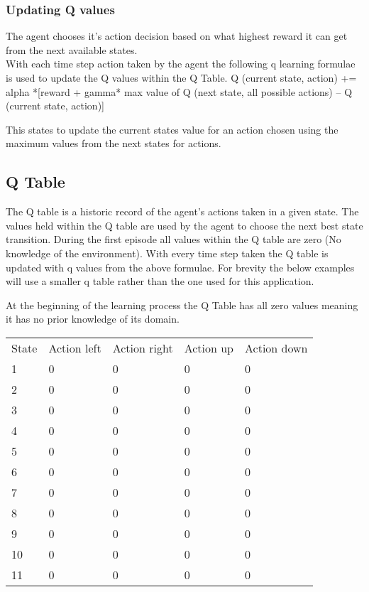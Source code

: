 \subsubsection{Updating Q values}
The agent chooses it's action decision based on what highest reward it can get from the next available states.\\
With each time step action taken by the agent the following q learning formulae is used to update the Q values within the Q Table.
Q (current state, action) += alpha *[reward + gamma* max value of Q (next state, all possible actions) – Q (current state, action)]

This states to update the current states value for an action chosen using the maximum values from the next states for actions.
\subsection{Q Table}
The Q table is a historic record of the agent’s actions taken in a given state. The values held within the Q table are used by the agent to choose the next best state transition. During the first episode all values within the Q table are zero (No knowledge of the environment). With every time step taken the Q table is updated with q values from the above formulae. For brevity the below examples will use a smaller q table rather than the one used for this application.


At the beginning of the learning process the Q Table has all zero values meaning it has no prior knowledge of its domain.
\begin{tabular}{lllll}
State & Action left & Action right & Action up & Action down \\
1     & 0           & 0            & 0         & 0           \\
2     & 0           & 0            & 0         & 0           \\
3     & 0           & 0            & 0         & 0           \\
4     & 0           & 0            & 0         & 0           \\
5     & 0           & 0            & 0         & 0           \\
6     & 0           & 0            & 0         & 0           \\
7     & 0           & 0            & 0         & 0           \\
8     & 0           & 0            & 0         & 0           \\
9     & 0           & 0            & 0         & 0           \\
10    & 0           & 0            & 0         & 0           \\
11    & 0           & 0            & 0         & 0          
\end{tabular}
\\
\\

